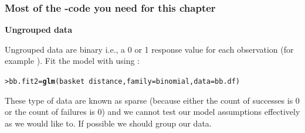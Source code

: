 \documentclass{beamer}\usepackage[]{graphicx}\usepackage[]{xcolor}
\makeatletter
\newcommand{\hlopt}[1]{\textcolor[rgb]{0,0,0}{#1}}%
\newcommand{\hlstd}[1]{\textcolor[rgb]{0.345,0.345,0.345}{#1}}%
\newcommand{\hlkwb}[1]{\textcolor[rgb]{0.69,0.353,0.396}{#1}}%
\newcommand{\hlkwc}[1]{\textcolor[rgb]{0.333,0.667,0.333}{#1}}%
\newcommand{\hlkwd}[1]{\textcolor[rgb]{0.737,0.353,0.396}{\textbf{#1}}}%
\newenvironment{kframe}{%
 \def\at@end@of@kframe{}%
 \ifinner\ifhmode%
  \def\at@end@of@kframe{\end{minipage}}%
  \begin{minipage}{\columnwidth}%
 \fi\fi%
 \def\FrameCommand##1{\hskip\@totalleftmargin \hskip-\fboxsep
 \colorbox{shadecolor}{##1}\hskip-\fboxsep
     \hskip-\linewidth \hskip-\@totalleftmargin \hskip\columnwidth}%
 \MakeFramed {\advance\hsize-\width
   \@totalleftmargin\z@ \linewidth\hsize
   \@setminipage}}%
 {\par\unskip\endMakeFramed%
 \at@end@of@kframe}
\newenvironment{knitrout}{}{} %
\makeatother
\begin{document}
\begin{frame}[fragile]
\frametitle{Most of the -code you need for this chapter}

{\bf Ungrouped data}
\medskip

Ungrouped data are binary i.e., a 0 or 1 response value for each observation (for example ). Fit the model with  using :

\begin{knitrout}\scriptsize
{}\color{fgcolor}\begin{kframe}
\begin{alltt}
\hlstd{> }\hlstd{bb.fit2} \hlkwb{=} \hlkwd{glm}\hlstd{(basket} \hlopt{~} \hlstd{distance,} \hlkwc{family} \hlstd{= binomial,} \hlkwc{data} \hlstd{= bb.df)}
\end{alltt}
\end{kframe}
\end{knitrout}

These type of data are known as sparse  (because either the count of successes is 0 or the count of failures is 0) and we cannot test our model assumptions effectively as we would like to. If possible we should group our data.
\end{frame}
\end{document}
